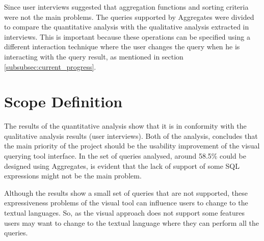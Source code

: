 Since user interviews suggested that aggregation functions and sorting criteria were not the main problems. The queries supported by Aggregates were divided to compare the quantitative analysis with the qualitative analysis extracted in interviews. This is important because these operations can be specified using a different interaction technique where the user changes the query when he is interacting with the query result, as mentioned in section \ref{subsubsec:current_progress}. 

\begin{table}[ht]
	\caption{Queries that could be designed using Aggregates and the queries which the tool does not support}
	\label{tab:aggregates_supported_vs_not_supported_stats}
\centering
{}
\end{table}


\section{Scope Definition}
\label{sec:scope_definition}
The results of the quantitative analysis show that it is in conformity with the qualitative analysis results (user interviews). Both of the analysis, concludes that the main priority of the project should be the usability improvement of the visual querying tool interface. 
In the set of queries analysed, around 58.5\% could be designed using Aggregates, is evident that the lack of support of some SQL expressions might not be the main problem.

Although the results show a small set of queries that are not supported, these expressiveness problems of the visual tool can influence users to change to the textual languages. So, as the visual approach does not support some features users may want to change to the textual language where they can perform all the queries.

